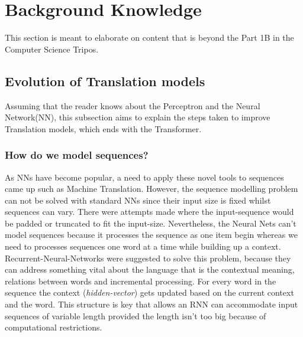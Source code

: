 \documentclass[12pt,a4paper,twoside,openright]{report}
\begin{document}
\section{Background Knowledge}
\label{background}
This section is meant to elaborate on content that is beyond the Part 1B in the Computer Science Tripos.

\subsection{Evolution of Translation models}
\label{evolution}
Assuming that the reader knows about the Perceptron and the Neural Network(NN)\cite{neural-net}, this subsection aims to explain the steps taken to improve Translation models, which ends with the Transformer.

\subsubsection{How do we model sequences?}

As NNs have become popular, a need to apply these novel tools to sequences came up such as Machine Translation.
However, the sequence modelling problem can not be solved with standard NNs since their input size is fixed whilst sequences can vary. There were attempts made where the input-sequence would be padded or truncated to fit the input-size. Nevertheless, the Neural Nets can't model sequences because it processes the sequence as one item begin whereas we need to processes sequences one word at a time while building up a context. Recurrent-Neural-Networks\cite{rnn} were suggested to solve this problem, because they can address something vital about the language that is the contextual meaning, relations between words and incremental processing.
For every word in the sequence the context (\textit{hidden-vector}) gets updated based on the current context and the word. This structure is key that allows an RNN can accommodate input sequences of variable length provided the length isn't too big because of computational restrictions.
\end{document}

